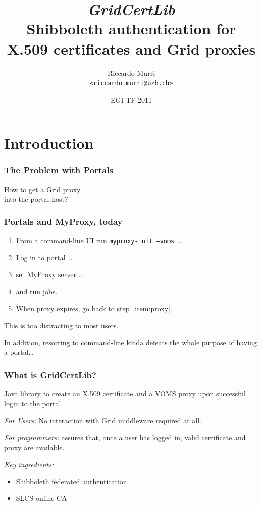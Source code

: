 \documentclass{beamer}
\title[GridCertLib]{%
  \emph{GridCertLib} 
  \\
  Shibboleth authentication for X.509 certificates and Grid proxies
}
\author[R.\ Murri]{Riccardo Murri
  \\ \texttt{<riccardo.murri@uzh.ch>}}%
\institute[GC3, University of Zurich]%
{\href{http://www.gc3.uzh.ch/}{Grid Computing Competence Centre}, 
  \\ \href{http://www.uzh.ch/}{University of Zurich}
  \\ \url{http://www.gc3.uzh.ch/}}%
\date{EGI TF 2011}%
\newcommand{\+}{\vspace{1em}}
\begin{document}
\begin{frame}
\maketitle
\end{frame}



\section[Introduction]{Introduction}

\begin{frame}
  \frametitle{The Problem with Portals}
  \begin{center}
    {\Huge How to get a Grid proxy \\ into the portal host?}
  \end{center}
\end{frame}


\begin{frame}
  \frametitle{Portals and MyProxy, today}

  \begin{enumerate}
  \item\label{item:proxy} From a command-line UI run
    \texttt{myproxy-init --voms} \dots
  \item Log in to portal \dots
  \item set MyProxy server \dots
  \item and run jobs.
  \item When proxy expires, go back to step~\ref{item:proxy}.
  \end{enumerate}
  
  \+
  This is too distracting to most users.

  \+
  In addition, resorting to command-line kinda defeats the whole
  purpose of having a portal\dots
\end{frame}


\begin{frame}
  \frametitle{What is GridCertLib?}
  
  Java library to create an X.509 certificate and a VOMS proxy upon
  successful login to the portal.

  \+ 
  \emph{For Users:} No interaction with Grid middleware required at all.

  \+
  \emph{For programmers:} assures that, once a user has logged in, valid
  certificate and proxy are available.

  \+
  \emph{Key ingredients:}
  \begin{itemize}
  \item Shibboleth federated authentication
  \item SLCS online CA
  \end{itemize}

\end{frame}
\end{document}
